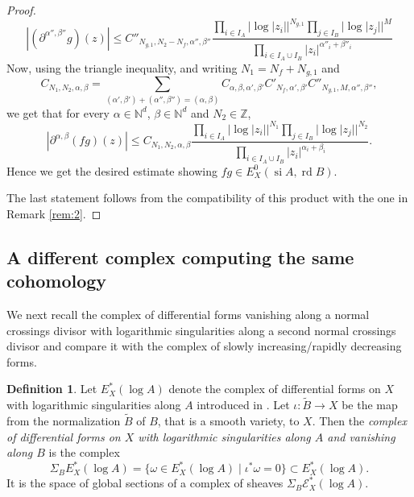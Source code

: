 \documentclass[11pt,a4paper]{amsart}
\newcommand{\N}{\mathds{N}}
\newcommand{\Z}{\mathds{Z}}
\newcommand{\caE}{\mathcal{E}}
\DeclareMathOperator{\si}{si}
\DeclareMathOperator{\rd}{rd}
\numberwithin{equation}{section}
\theoremstyle{plain}
\theoremstyle{definition}
\newtheorem{df}[prop]{Definition}
\begin{document}
\begin{proof}
\begin{displaymath}
|(\partial^{\alpha'',\beta''}g)(z)|\le C''_{N_{g,1},N_{2}-N_{f},\alpha'' ,\beta''}
    \frac{\prod_{i\in I_A}|\log|z_i||^{N_{g,1}}
    \prod_{j\in I_B}|\log|z_j||^{M}}{\prod_{i\in I_{A}\cup I_{B}}|z_{i}|^{\alpha'' _{i}+\beta'' _{i}}}
\end{displaymath}
Now, using the triangle inequality, and writing $N_{1}=N_{f}+N_{g,1}$ and 
\begin{displaymath}
C_{N_{1},N_{2},\alpha,\beta}=\sum_{(\alpha ',\beta  ')+(\alpha '',\beta
  '')=(\alpha ,\beta )} C_{\alpha ,\beta ,\alpha ',\beta
  '}C'_{N_{f},\alpha' ,\beta'} C''_{N_{g,1}, M, \alpha'',\beta''},  
\end{displaymath}
we get that for every $\alpha \in \N^{d}$, $\beta\in \N^{d} $ and
$N_{2}\in \Z$,
\begin{displaymath}
  |\partial^{\alpha,\beta}(fg)(z)|\le C_{N_{1},N_{2},\alpha,\beta}
  \frac{\prod_{i\in I_A}|\log|z_i||^{N_{1}}
    \prod_{j\in I_B}|\log|z_j||^{N_{2}}}{\prod_{i\in I_{A}\cup
      I_{B}}|z_{i}|^{\alpha _{i}+\beta _{i}}} .
\end{displaymath}
Hence we get the  desired estimate showing $fg\in E_{X}^{0}(\si A, \rd
B)$.

The last statement follows from the compatibility of this product with
the one in Remark \ref{rem:2}.
\end{proof}


\subsection{A different complex computing the same cohomology}
\label{sec:forms-vanishing-ncd}
We next recall the complex of differential forms vanishing along a
normal crossings divisor with logarithmic singularities along a second normal
crossings divisor and compare it with the complex of slowly
increasing/rapidly decreasing forms.

\begin{df}\label{def:5}
Let $E^{\ast}_{X}(\log A)$ denote the complex of differential forms on
$X$ with logarithmic singularities along $A$ introduced in
\cite{Burgos:CDc}. Let $\iota \colon \widetilde B \to X$ be the map
from the normalization $\widetilde B$ of $B$, that is a smooth
variety, to $X$. Then the \emph{complex of differential forms on $X$
  with logarithmic singularities along $A$ and vanishing along $B$} is
the complex 
\begin{equation*}
  \Sigma _{B}E^{\ast}_{X}(\log A)=
  \{\omega \in E^{\ast}_{X}(\log A)\mid
  \iota ^{\ast} \omega =0\}
  \subset E^{\ast}_{X}(\log A).
\end{equation*}
It is the space of global sections of a complex of sheaves
$\Sigma _{B}\caE^{\ast}_{X}(\log A)$.
\end{df}
\end{document}
